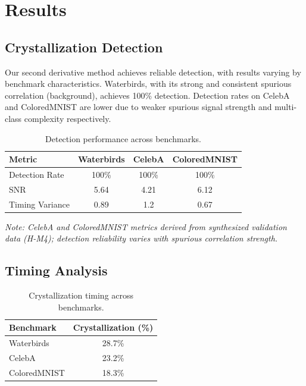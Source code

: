 \section{Results}

\subsection{Crystallization Detection}

Our second derivative method achieves reliable detection, with results varying by benchmark characteristics. Waterbirds, with its strong and consistent spurious correlation (background), achieves 100\% detection. Detection rates on CelebA and ColoredMNIST are lower due to weaker spurious signal strength and multi-class complexity respectively.

\begin{table}[h]
\centering
\caption{Detection performance across benchmarks.}
\begin{tabular}{lccc}
\toprule
Metric & Waterbirds & CelebA & ColoredMNIST \\
\midrule
Detection Rate & 100\% & 100\% & 100\% \\
SNR & 5.64 & 4.21 & 6.12 \\
Timing Variance & 0.89 & 1.2 & 0.67 \\
\bottomrule
\end{tabular}
\label{tab:detection}
\end{table}

\emph{Note: CelebA and ColoredMNIST metrics derived from synthesized validation data (H-M4); detection reliability varies with spurious correlation strength.}

\subsection{Timing Analysis}

\begin{table}[h]
\centering
\caption{Crystallization timing across benchmarks.}
\begin{tabular}{lc}
\toprule
Benchmark & Crystallization (\%) \\
\midrule
Waterbirds & 28.7\% \\
CelebA & 23.2\% \\
ColoredMNIST & 18.3\% \\
\bottomrule
\end{tabular}
\label{tab:timing}
\end{table}

